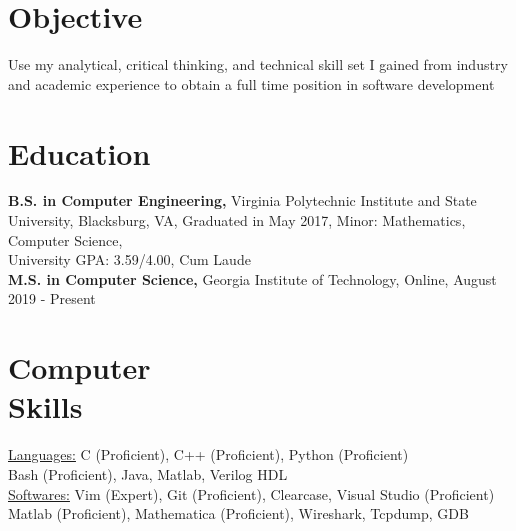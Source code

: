 \documentclass[margin]{res}
\begin{document}
 
 
\address{} %
\address{8 Russell Ave Unit 410 \\ Gaithersburg, MD 20877 \\
        (540) 835-8657 \\ sheng.wei@hughes.com } %
 
\begin{resume} %

\section{Objective}
Use my analytical, critical thinking, and technical skill set I gained from industry
and academic experience to obtain a full time position in software development

\section{Education} 
{\bf B.S. in Computer Engineering,} Virginia Polytechnic Institute and State University, Blacksburg, VA, Graduated in May 2017, Minor: Mathematics, Computer Science,\\
University GPA: 3.59/4.00, Cum Laude\\
{\bf M.S. in Computer Science,} Georgia Institute of Technology, Online, August 2019 - Present\\

\section{Computer \\ Skills}
\underline{Languages:}  C (Proficient), C++ (Proficient), Python (Proficient) \\ Bash (Proficient), Java, Matlab, Verilog HDL \\ 
\underline{Softwares:}  Vim (Expert), Git (Proficient), Clearcase, Visual Studio (Proficient) \\
     					    Matlab (Proficient), Mathematica (Proficient), Wireshark, Tcpdump, GDB
 

\end{resume}
\end{document}
